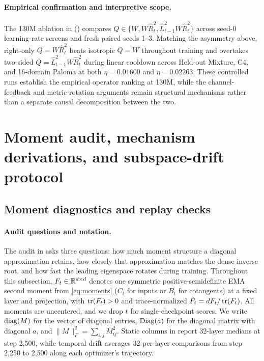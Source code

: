 \paragraph{Empirical confirmation and interpretive scope.}
The 130M ablation in  () compares $Q\in\{W, W\hat R_t^2, \hat L_{t-1}^2 W\hat R_t^2\}$ across seed-0 learning-rate screens and fresh paired seeds 1--3. Matching the asymmetry above, right-only $Q=W\hat R_t^2$ beats isotropic $Q=W$ throughout training and overtakes two-sided $Q=\hat L_{t-1}^2 W\hat R_t^2$ during linear cooldown across Held-out Mixture, C4, and 16-domain Paloma at both $\eta=0.01600$ and $\eta=0.02263$. These controlled runs establish the empirical operator ranking at 130M, while the channel-feedback and metric-rotation arguments remain structural mechanisms rather than a separate causal decomposition between the two.

\section{Moment audit, mechanism derivations, and subspace-drift protocol}
\label{app:appendix_mech}

\subsection{Moment diagnostics and replay checks}
\label{app:diagnostic_definitions}

\paragraph{Audit questions and notation.}
The audit in  asks three questions: how much moment structure a diagonal approximation retains, how closely that approximation matches the dense inverse root, and how fast the leading eigenspace rotates during training. Throughout this subsection, $F_t\in\mathbb{R}^{d\times d}$ denotes one symmetric positive-semidefinite EMA second moment from \cref{eq:moments} ($C_t$ for inputs or $B_t$ for cotangents) at a fixed layer and projection, with $\operatorname{tr}(F_t)>0$ and trace-normalized $\tilde F_t=dF_t/\operatorname{tr}(F_t)$. All moments are uncentered, and we drop $t$ for single-checkpoint scores. We write $\operatorname{diag}(M)$ for the vector of diagonal entries, $\operatorname{Diag}(a)$ for the diagonal matrix with diagonal $a$, and $\|M\|_F^2=\sum_{i,j}M_{ij}^2$. Static columns in  report 32-layer medians at step 2,500, while temporal drift averages 32 per-layer comparisons from step 2,250 to 2,500 along each optimizer's trajectory.

